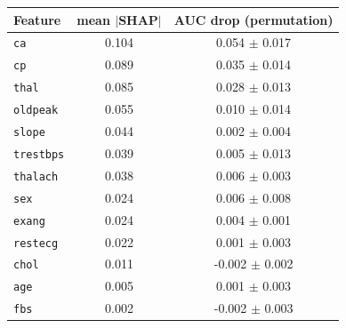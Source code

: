 \begin{tabular}{lcc}
\toprule
Feature & mean $|$SHAP$|$ & AUC drop (permutation) \\
\midrule
\texttt{ca} & 0.104 & 0.054 $\pm$ 0.017 \\
\texttt{cp} & 0.089 & 0.035 $\pm$ 0.014 \\
\texttt{thal} & 0.085 & 0.028 $\pm$ 0.013 \\
\texttt{oldpeak} & 0.055 & 0.010 $\pm$ 0.014 \\
\texttt{slope} & 0.044 & 0.002 $\pm$ 0.004 \\
\texttt{trestbps} & 0.039 & 0.005 $\pm$ 0.013 \\
\texttt{thalach} & 0.038 & 0.006 $\pm$ 0.003 \\
\texttt{sex} & 0.024 & 0.006 $\pm$ 0.008 \\
\texttt{exang} & 0.024 & 0.004 $\pm$ 0.001 \\
\texttt{restecg} & 0.022 & 0.001 $\pm$ 0.003 \\
\texttt{chol} & 0.011 & -0.002 $\pm$ 0.002 \\
\texttt{age} & 0.005 & 0.001 $\pm$ 0.003 \\
\texttt{fbs} & 0.002 & -0.002 $\pm$ 0.003 \\
\bottomrule
\end{tabular}

